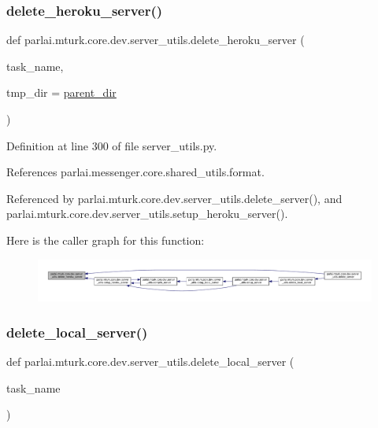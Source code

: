 \subsubsection{\texorpdfstring{delete\+\_\+heroku\+\_\+server()}{delete\_heroku\_server()}}
{\footnotesize\ttfamily def parlai.\+mturk.\+core.\+dev.\+server\+\_\+utils.\+delete\+\_\+heroku\+\_\+server (\begin{DoxyParamCaption}\item[{}]{task\+\_\+name,  }\item[{}]{tmp\+\_\+dir = {\ttfamily \hyperlink{namespaceparlai_1_1mturk_1_1core_1_1dev_1_1server__utils_a432ae14c0d872fbfebe4d9b7d73d13b9}{parent\+\_\+dir}} }\end{DoxyParamCaption})}



Definition at line 300 of file server\+\_\+utils.\+py.



References parlai.\+messenger.\+core.\+shared\+\_\+utils.\+format.



Referenced by parlai.\+mturk.\+core.\+dev.\+server\+\_\+utils.\+delete\+\_\+server(), and parlai.\+mturk.\+core.\+dev.\+server\+\_\+utils.\+setup\+\_\+heroku\+\_\+server().

Here is the caller graph for this function\+:
\nopagebreak
\begin{figure}[H]
\begin{center}
\leavevmode
\includegraphics[width=350pt]{namespaceparlai_1_1mturk_1_1core_1_1dev_1_1server__utils_a876e990f1f5e670ff9c89869bdd1f1f6_icgraph}
\end{center}
\end{figure}
\mbox{\label{namespaceparlai_1_1mturk_1_1core_1_1dev_1_1server__utils_aa5556bd5a5a417d78b4142e697e9a6be}} 
\subsubsection{\texorpdfstring{delete\+\_\+local\+\_\+server()}{delete\_local\_server()}}
{\footnotesize\ttfamily def parlai.\+mturk.\+core.\+dev.\+server\+\_\+utils.\+delete\+\_\+local\+\_\+server (\begin{DoxyParamCaption}\item[{}]{task\+\_\+name }\end{DoxyParamCaption})}



